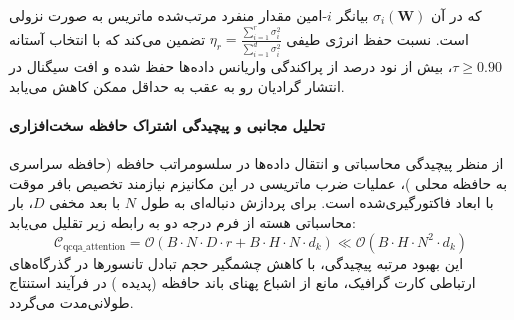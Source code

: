 که در آن $\sigma_i(\mathbf{W})$ بیانگر $i$-امین مقدار منفرد مرتب‌شده ماتریس به صورت نزولی است. نسبت حفظ انرژی طیفی $\eta_r = \frac{\sum_{i=1}^r \sigma_i^2}{\sum_{i=1}^{d} \sigma_i^2}$ تضمین می‌کند که با انتخاب آستانه $\tau \ge 0.90$، بیش از نود درصد از پراکندگی واریانس داده‌ها حفظ شده و افت سیگنال در انتشار گرادیان رو به عقب به حداقل ممکن کاهش می‌یابد.

\paragraph{تحلیل مجانبی و پیچیدگی اشتراک حافظه سخت‌افزاری}
از منظر پیچیدگی محاسباتی و انتقال داده‌ها در سلسومراتب حافظه (حافظه سراسری  به حافظه محلی )، عملیات ضرب ماتریسی در این مکانیزم نیازمند تخصیص بافر موقت با ابعاد فاکتورگیری‌شده است. برای پردازش دنباله‌ای به طول $N$ با بعد مخفی $D$، بار محاسباتی هسته از فرم درجه دو به رابطه زیر تقلیل می‌یابد:
\begin{equation}
\label{eq:complexity_qcqa_attention}
\mathcal{C}_{\text{qcqa\_attention}} = \mathcal{O}\left( B \cdot N \cdot D \cdot r + B \cdot H \cdot N \cdot d_k \right) \ll \mathcal{O}\left( B \cdot H \cdot N^2 \cdot d_k \right)
\end{equation}
این بهبود مرتبه پیچیدگی، با کاهش چشمگیر حجم تبادل تانسورها در گذرگاه‌های ارتباطی کارت گرافیک، مانع از اشباع پهنای باند حافظه (پدیده ) در فرآیند استنتاج طولانی‌مدت می‌گردد.
